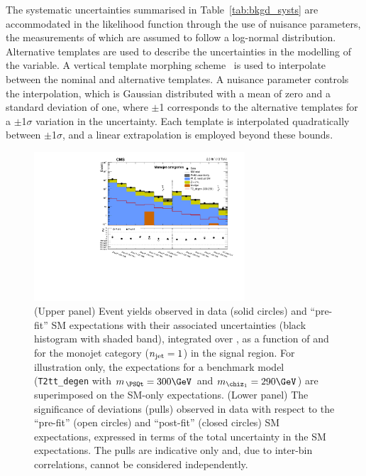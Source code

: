 The systematic uncertainties summarised in Table~\ref{tab:bkgd_systs}
are accommodated in the likelihood function through the use of
nuisance parameters, the measurements of which are assumed to follow a
log-normal distribution. Alternative templates are used to describe
the uncertainties in the modelling of the \HTmiss variable. A vertical
template morphing scheme~\cite{Prosper:2011zz} is used to interpolate
between the nominal and alternative \HTmiss templates. A nuisance
parameter controls the interpolation, which is Gaussian distributed
with a mean of zero and a standard deviation of one, where $\pm$1
corresponds to the alternative templates for a $\pm$1$\sigma$
variation in the uncertainty. Each template is interpolated
quadratically between $\pm$1$\sigma$, and a linear extrapolation is
employed beyond these bounds.

\begin{figure}[!b]
  \begin{center}
    \includegraphics[width=0.7\textwidth]{figures/result/v2/summaryPlot_Monojet_prefit_overlay_fit_b}
    \caption{(Upper panel) Event yields observed in data (solid circles)
      and ``pre-fit'' SM expectations with their associated
      uncertainties (black histogram with shaded band), integrated
      over \HTmiss, as a function of \nb and \scalht for the monojet
      category ($n_{\text{jet}} = 1$) in the signal region. For illustration
      only, the expectations for a benchmark model
      (\texttt{T2tt\_degen} with $m_{\,\PSQt} = 300\GeV$ and
      $m_{\chiz_1} = 290\GeV$) are superimposed on the SM-only
      expectations. (Lower panel) The significance of deviations
      (pulls) observed in data with respect to the ``pre-fit'' (open
      circles) and ``post-fit'' (closed circles) SM expectations,
      expressed in terms of the total uncertainty in the SM
      expectations. The pulls are indicative only and, due to
      inter-bin correlations, cannot be considered independently.}  
    \label{fig:mono}
  \end{center}
\end{figure}

